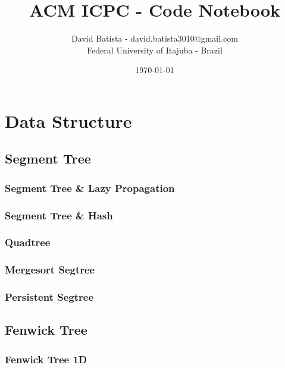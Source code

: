 \documentclass[10pt,a4paper]{report}
\begin{document}
\title{ACM ICPC - Code Notebook}
\author{David Batista - david.batista3010@gmail.com \\ Federal University of Itajuba - Brazil}
\date{\today}
\maketitle
\tableofcontents

\chapter{Data Structure}
	
	\section{Segment Tree}
		\subsection{Segment Tree \& Lazy Propagation}
			
		\newpage
		\subsection{Segment Tree \& Hash}
			
		\newpage
		\subsection{Quadtree}
			
		\newpage
		\subsection{Mergesort Segtree}
			
		\newpage
		\subsection{Persistent Segtree}
			
	
	\newpage		
	\section{Fenwick Tree}
		\subsection{Fenwick Tree 1D}
			
		\newpage
\end{document}
